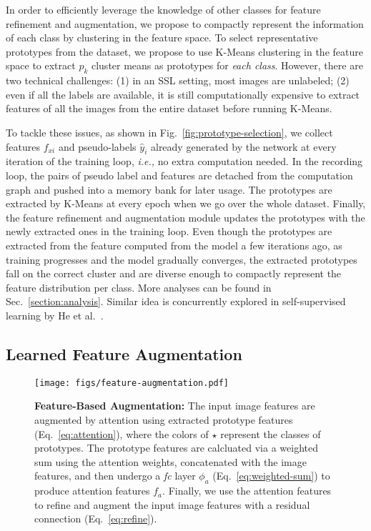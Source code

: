 \documentclass[runningheads]{llncs}
\begin{document}
In order to efficiently leverage the knowledge of other classes for feature refinement and augmentation, we propose to compactly represent the information of each class by clustering in the feature space.
To select representative prototypes from the dataset, we propose to use K-Means clustering in the feature space to extract $p_k$ cluster means as prototypes for \textit{each class}.
However, there are two technical challenges:
(1) in an SSL setting, most images are unlabeled;
(2) even if all the labels are available, it is still computationally expensive to extract features of all the images from the entire dataset before running K-Means.

To tackle these issues, as shown in Fig.~\ref{fig:prototype-selection}, we collect features $f_{xi}$ and pseudo-labels $\hat{y}_i$ already generated by the network at every iteration of the training loop, \textit{i.e.,} no extra computation needed.
In the recording loop, the pairs of pseudo label and features are detached from the computation graph and pushed into a memory bank for later usage.
The prototypes are extracted by K-Means at every epoch when we go over the whole dataset.
Finally, the feature refinement and augmentation module updates the prototypes with the newly extracted ones in the training loop.
Even though the prototypes are extracted from the feature computed from the model a few iterations ago, as training progresses and the model gradually converges, the extracted prototypes fall on the correct cluster and are diverse enough to compactly represent the feature distribution per class.
More analyses can be found in Sec.~\ref{section:analysis}.
Similar idea is concurrently explored in self-supervised learning by He et al.~\cite{wu2018unsupervised,he2019momentum}.

\subsection{Learned Feature Augmentation}

\begin{figure}
\centering
\texttt{[image: figs/feature-augmentation.pdf]}
\caption{
\textbf{Feature-Based Augmentation:} The input image features are augmented by attention using extracted prototype features (Eq.~\ref{eq:attention}), where the colors of $\star$ represent the classes of prototypes.
The prototype features are calcluated via a weighted sum using the attention weights, concatenated with the image features, and then undergo a \textit{fc} layer $\phi_a$ (Eq.~\ref{eq:weighted-sum}) to produce attention features $f_a$.
Finally, we use the attention features to refine and augment the input image features with a residual connection (Eq.~\ref{eq:refine}).
}
\label{fig:feature-augmentation}
\end{figure}
\end{document}
